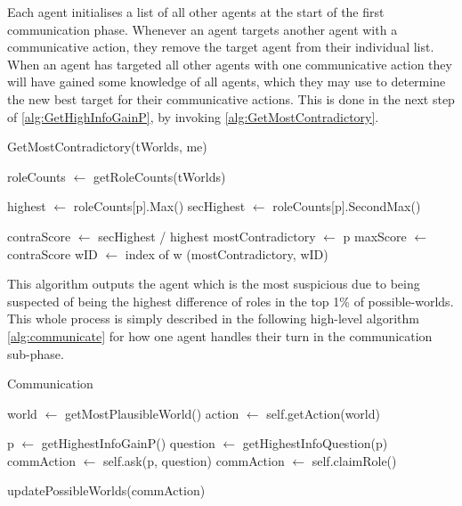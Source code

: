 \setcounter{algorithmcaption}{3}
Each agent initialises a list of all other agents at the
start of the first communication phase. Whenever an agent targets another agent
with a communicative action, they remove the target agent from their individual
list. When an agent has targeted all other agents with one communicative action
they will have gained some knowledge of all agents, which they may use to determine
the new best target for their communicative
actions. This is done in the next step of \cref{alg:GetHighInfoGainP},
by invoking \cref{alg:GetMostContradictory}.
\begin{algorithm}[H]
	\caption{GetMostContradictory(tWorlds, me)}
	\begin{algorithmic}
		\State roleCounts $\gets$ getRoleCounts(tWorlds)

		\State highest $\gets$ roleCounts[p].Max()
		\State secHighest $\gets$ roleCounts[p].SecondMax()

		\State contraScore $\gets$ secHighest / highest
		\State mostContradictory $\gets$ p
		\State maxScore $\gets$ contraScore
		\State wID $\gets$ index of w
		\EndIf
		\EndFor
		\EndFor
		\State \Return (mostContradictory, wID)
	\end{algorithmic}\label{alg:GetMostContradictory}
\end{algorithm}
\setcounter{algorithmcaption}{4}
This algorithm outputs the agent which is the most suspicious due to being
suspected of being the highest difference of roles in the top 1\% of possible-worlds.\\
This whole process is simply described in the following high-level algorithm
\ref{alg:communicate} for how one agent handles their turn in the communication
sub-phase.
\begin{algorithm}[H]
	\caption{Communication}
	\begin{algorithmic}[1]
		\State world $\gets$ getMostPlausibleWorld()
		\State action $\gets$ self.getAction(world)

		\State p $\gets$ getHighestInfoGainP()
		\State question $\gets$ getHighestInfoQuestion(p)
		\State commAction $\gets$ self.ask(p, question)
		\State commAction $\gets$ self.claimRole()
		\EndIf

		\State updatePossibleWorlds(commAction)
		\EndFunction
	\end{algorithmic}\label{alg:communicate}
\end{algorithm}
